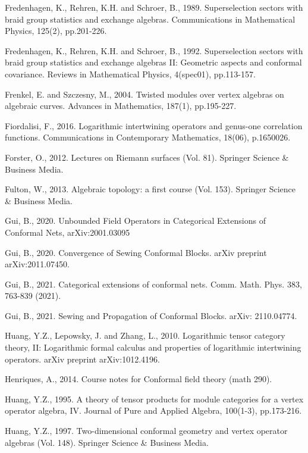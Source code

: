 \documentclass[12pt,a4paper,notitlepage]{article}
\theoremstyle{definition}
\theoremstyle{plain}
\numberwithin{equation}{subsection}
\begin{document}
\begin{thebibliography}{999999}
Fredenhagen, K., Rehren, K.H. and Schroer, B., 1989. Superselection sectors with braid group statistics and exchange algebras. Communications in Mathematical Physics, 125(2), pp.201-226.

Fredenhagen, K., Rehren, K.H. and Schroer, B., 1992. Superselection sectors with braid group statistics and exchange algebras II: Geometric aspects and conformal covariance. Reviews in Mathematical Physics, 4(spec01), pp.113-157.

Frenkel, E. and Szczesny, M., 2004. Twisted modules over vertex algebras on algebraic curves. Advances in Mathematics, 187(1), pp.195-227.

Fiordalisi, F., 2016. Logarithmic intertwining operators and genus-one correlation functions. Communications in Contemporary Mathematics, 18(06), p.1650026.		


Forster, O., 2012. Lectures on Riemann surfaces (Vol. 81). Springer Science \& Business Media.

Fulton, W., 2013. Algebraic topology: a first course (Vol. 153). Springer Science \& Business Media.


Gui, B., 2020. Unbounded Field Operators in Categorical Extensions of Conformal Nets,  arXiv:2001.03095

Gui, B., 2020. Convergence of Sewing Conformal Blocks. arXiv preprint arXiv:2011.07450.

Gui, B., 2021. Categorical extensions of conformal nets. Comm. Math. Phys. 383, 763-839 (2021).

Gui, B., 2021. Sewing and Propagation of Conformal Blocks. arXiv: 2110.04774.

Huang, Y.Z., Lepowsky, J. and Zhang, L., 2010. Logarithmic tensor category theory, II: Logarithmic formal calculus and properties of logarithmic intertwining operators. arXiv preprint arXiv:1012.4196.

Henriques, A., 2014. Course notes for Conformal field theory (math 290).


Huang, Y.Z., 1995. A theory of tensor products for module categories for a vertex operator algebra, IV. Journal of Pure and Applied Algebra, 100(1-3), pp.173-216.

Huang, Y.Z., 1997. Two-dimensional conformal geometry and vertex operator algebras (Vol. 148). Springer Science \& Business Media.


\end{thebibliography}
\end{document}
